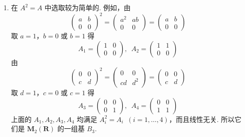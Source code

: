 \documentclass[UTF8,12pt,a4paper,fontset=fandol]{ctexart}
\begin{document}
\begin{solve}
\begin{enumerate}
                \item 在 $ A^2 = A $ 中选取较为简单的. 例如，由
                      \[ \begin{pmatrix} a & b \\ 0 & 0 \end{pmatrix}^2 = \begin{pmatrix} a^2 & ab \\ 0 & 0 \end{pmatrix} = \begin{pmatrix} a & b \\ 0 & 0 \end{pmatrix} \]
                      取 $ a = 1 $，$ b = 0 $ 或 $ b = 1 $ 得
                      \[ A_1 = \begin{pmatrix} 1 & 0 \\ 0 & 0 \end{pmatrix},\enspace A_2 = \begin{pmatrix} 1 & 1 \\ 0 & 0 \end{pmatrix} \]
                      由
                      \[ \begin{pmatrix} 0 & 0 \\ c & d \end{pmatrix}^2 = \begin{pmatrix} 0 & 0 \\ cd & d^2 \end{pmatrix} = \begin{pmatrix} 0 & 0 \\ c & d \end{pmatrix} \]
                      取 $ d = 1 $，$ c = 0 $ 或 $ c = 1 $ 得
                      \[ A_3 = \begin{pmatrix} 0 & 0 \\ 0 & 1 \end{pmatrix},\enspace A_4 = \begin{pmatrix} 0 & 0 \\ 1 & 1 \end{pmatrix} \]
                      上面的 $ A_1, A_2, A_3, A_4 $ 均满足 $ A_i^2 = A_i \enspace(i = 1, \ldots, 4) $，而且线性无关. 所以它们是 $ \mathbf{M}_2(\mathbf{R}) $ 的一组基 $ B_3 $.


\end{enumerate}
\end{solve}
\end{document}
